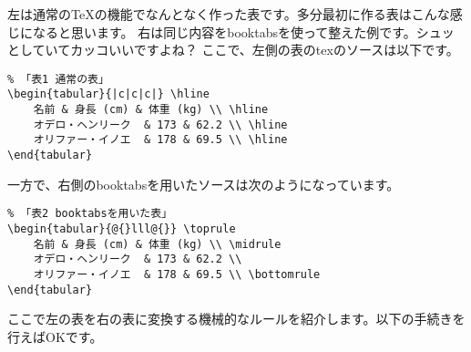 \documentclass[uplatex,onecolumn,9pt,dvipdfmx]{jsarticle}
\begin{document}
左は通常のTeXの機能でなんとなく作った表です。多分最初に作る表はこんな感じになると思います。
右は同じ内容をbooktabsを使って整えた例です。シュッとしていてカッコいいですよね？
ここで、左側の表のtexのソースは以下です。 
\begin{verbatim}
% 「表1 通常の表」
\begin{tabular}{|c|c|c|} \hline
    名前 & 身長 (cm) & 体重 (kg) \\ \hline
    オデロ・ヘンリーク  & 173 & 62.2 \\ \hline 
    オリファー・イノエ  & 178 & 69.5 \\ \hline   
\end{tabular}
\end{verbatim}
一方で、右側のbooktabsを用いたソースは次のようになっています。
\begin{verbatim}
% 「表2 booktabsを用いた表」
\begin{tabular}{@{}lll@{}} \toprule
    名前 & 身長 (cm) & 体重 (kg) \\ \midrule
    オデロ・ヘンリーク  & 173 & 62.2 \\ 
    オリファー・イノエ  & 178 & 69.5 \\ \bottomrule   
\end{tabular}
\end{verbatim}
ここで左の表を右の表に変換する機械的なルールを紹介します。以下の手続きを行えばOKです。
\end{document}
